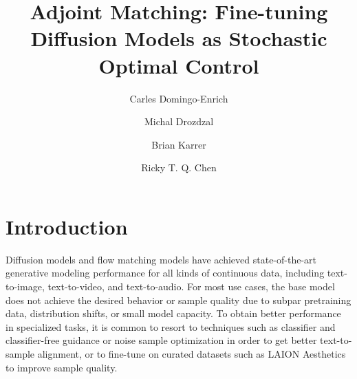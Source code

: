 \documentclass[]{fairmeta}
\title{Adjoint Matching: Fine-tuning Diffusion Models as Stochastic Optimal Control}
\author[1]{Carles Domingo-Enrich}
\author[1]{Michal Drozdzal}
\author[1]{Brian Karrer}
\author[1]{Ricky T. Q. Chen}
\affiliation[1]{FAIR, Meta}
\begin{document}
\maketitle

\section{Introduction}
\label{sec:intro}

Diffusion models %
\citep{song2019generative,ho2020denoising,song2021scorebased,kingma2021ondensity}
and flow matching models \citep{lipman2022flow,albergo2022building} have achieved state-of-the-art generative modeling performance for all kinds of continuous data, including text-to-image, text-to-video, and text-to-audio. For most use cases, the base model does not achieve the desired behavior or sample quality due to subpar pretraining data, distribution shifts, or small model capacity. To obtain better performance in specialized tasks, it is common to resort to techniques such as classifier and classifier-free guidance \citep{dhariwal2021diffusion,ho2021classifierfree} or noise sample optimization \citep{wallace2023endtoend,benhamu2024dflow} in order to get better text-to-sample alignment, or to fine-tune on curated datasets such as LAION Aesthetics \citep{schuhmann2022laion} to improve sample quality.
\end{document}
